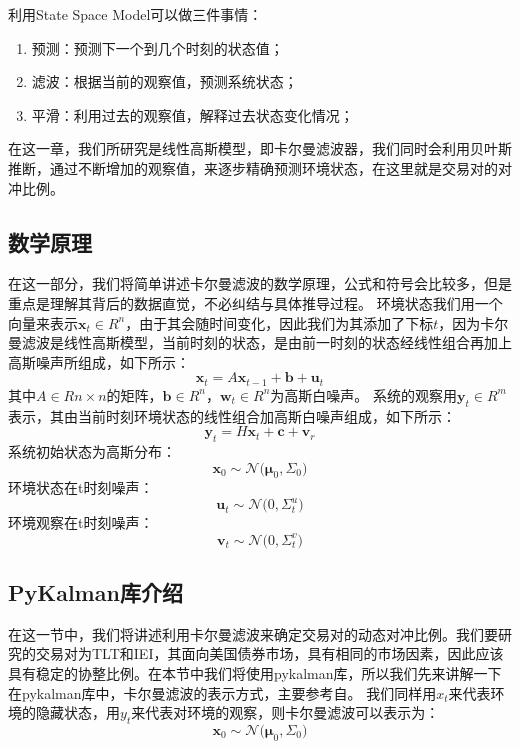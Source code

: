 \documentclass{article}
\begin{document}
利用State Space Model可以做三件事情：
\begin{enumerate}
\item 预测：预测下一个到几个时刻的状态值；
\item 滤波：根据当前的观察值，预测系统状态；
\item 平滑：利用过去的观察值，解释过去状态变化情况；
\end{enumerate}
在这一章，我们所研究是线性高斯模型，即卡尔曼滤波器，我们同时会利用贝叶斯推断，通过不断增加的观察值，来逐步精确预测环境状态，在这里就是交易对的对冲比例。\newline
\subsection{数学原理}
在这一部分，我们将简单讲述卡尔曼滤波的数学原理，公式和符号会比较多，但是重点是理解其背后的数据直觉，不必纠结与具体推导过程。\newline
环境状态我们用一个向量来表示$\boldsymbol{x}_{t} \in R^{n}$，由于其会随时间变化，因此我们为其添加了下标$t$，因为卡尔曼滤波是线性高斯模型，当前时刻的状态，是由前一时刻的状态经线性组合再加上高斯噪声所组成，如下所示：
\begin{equation}
\boldsymbol{x}_{t} = A\boldsymbol{x}_{t-1} + \boldsymbol{b} + \boldsymbol{u}_{t}
\label{e000065}
\end{equation}
其中$A \in R{n \times n}$的矩阵，$\boldsymbol{b} \in R^{n}$，$\boldsymbol{w}_{t} \in R^{n}$为高斯白噪声。\newline
系统的观察用$\boldsymbol{y}_t \in R^{m}$表示，其由当前时刻环境状态的线性组合加高斯白噪声组成，如下所示：
\begin{equation}
\boldsymbol{y}_{t} = H\boldsymbol{x}_{t} + \boldsymbol{c} + \boldsymbol{v}_{r}
\label{e000066}
\end{equation}
系统初始状态为高斯分布：
\begin{equation}
\boldsymbol{x}_{0} \sim \mathcal{N} \big( \boldsymbol{\mu}_{0}, \Sigma _{0} \big)
\label{e000067}
\end{equation}
环境状态在t时刻噪声：
\begin{equation}
\boldsymbol{u}_{t} \sim \mathcal{N} \big( 0, \Sigma _{t}^{u} \big)
\label{e000068}
\end{equation}
环境观察在t时刻噪声：
\begin{equation}
\boldsymbol{v}_{t} \sim \mathcal{N} \big( 0, \Sigma _{t}^{v} \big)
\label{e000069}
\end{equation}
\subsection{PyKalman库介绍}
在这一节中，我们将讲述利用卡尔曼滤波来确定交易对的动态对冲比例。我们要研究的交易对为TLT和IEI，其面向美国债券市场，具有相同的市场因素，因此应该具有稳定的协整比例。在本节中我们将使用pykalman库，所以我们先来讲解一下在pykalman库中，卡尔曼滤波的表示方式，主要参考自\cite{r000003}。\newline
我们同样用$x_{t}$来代表环境的隐藏状态，用$y_{t}$来代表对环境的观察，则卡尔曼滤波可以表示为：
\begin{equation}
\boldsymbol{x}_{0} \sim \mathcal{N} \big( \boldsymbol{\mu}_{0}, \Sigma _{0} \big)
\label{e000070}
\end{equation}
\end{document}
